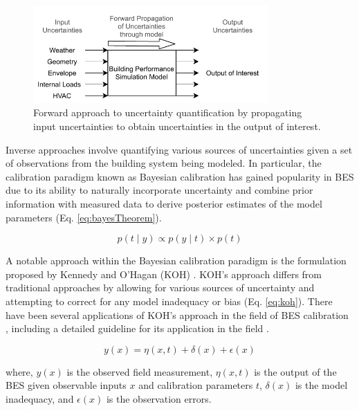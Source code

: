 \documentclass[review]{elsarticle}
\begin{document}
\begin{figure}[!h]
\centering
\includegraphics[width=0.8\textwidth]{figures/forward_uncertainty.pdf}
\caption{Forward approach to uncertainty quantification by propagating input uncertainties to obtain uncertainties in the output of interest.}
\label{fig:forward}
\end{figure}

Inverse approaches involve quantifying various sources of uncertainties given a set of observations from the building system being modeled. In particular, the calibration paradigm known as Bayesian calibration has gained popularity in BES due to its ability to naturally incorporate uncertainty and combine prior information with measured data to derive posterior estimates of the model parameters (Eq. \ref{eq:bayesTheorem}). 

\begin{equation}\label{eq:bayesTheorem}
p(t\mid y)\propto p(y \mid t) \times p(t)
\end{equation}

A notable approach within the Bayesian calibration paradigm is the formulation
proposed by Kennedy and O'Hagan (KOH) \cite{kennedy2001bayesian}. KOH's approach differs from traditional approaches by allowing for various sources of uncertainty and attempting to correct for any model inadequacy or bias (Eq. \ref{eq:koh}). There have been several applications of KOH's approach in the field of BES calibration \cite{martinez2019energy, menberg2019influence, chong2017bayesian, yuan2017simultaneous,li2016assessment, heo2015evaluation, chong2019continuous, chen2019district, tardioli2020methodology}, including a detailed guideline for its application in the field \cite{chong2018guidelines}. 

\begin{equation}\label{eq:koh}
y(x) = \eta(x,t) + \delta(x) + \epsilon(x)
\end{equation}

\noindent where, $y(x)$ is the observed field measurement, $\eta(x,t)$ is the output of the BES given observable inputs $x$ and calibration parameters $t$, $\delta(x)$ is the model inadequacy, and $\epsilon(x)$ is the observation errors. 
\end{document}
